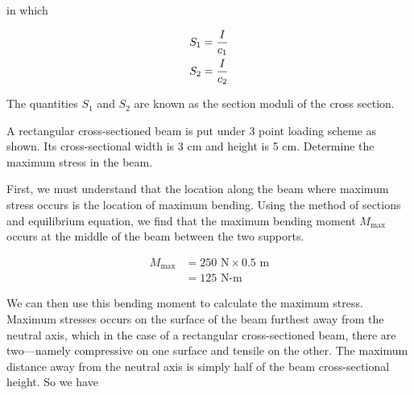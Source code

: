 \documentclass[
fontsize=10pt,
a4paper,
twosides=false,
open=any,
svgnames,
]{kaobook} %
\begin{document}
in which

\[\begin{gathered}
  S_1 = \frac{I}{c_1} \hfill \\
  S_2 = \frac{I}{c_2} \hfill \\ 
\end{gathered} \]

The quantities $S_1$ and $S_2$ are known as the section moduli of the cross section.

\begin{example}
  A rectangular cross-sectioned beam is put under 3 point loading scheme as shown. Its cross-sectional width is 3 cm and height is 5 cm. Determine the maximum stress in the beam.

  \begin{figure}[H]
    \centering
  \end{figure}

  First, we must understand that the location along the beam where maximum stress occurs is the location of maximum bending. Using the method of sections and equilibrium equation, we find that the maximum bending moment $M_{\max}$ occurs at the middle of the beam between the two supports.

  \begin{align*}
    M_{\max} &= 250 \text{ N} \times 0.5 \text{ m} \\
             &= 125 \text{ N-m}
  \end{align*}
  
  We can then use this bending moment to calculate the maximum stress. Maximum stresses occurs on the surface of the beam furthest away from the neutral axis, which in the case of a rectangular cross-sectioned beam, there are two—namely compressive on one surface and tensile on the other. The maximum distance away from the neutral axis is simply half of the beam cross-sectional height. So we have
  

\end{example}
\end{document}
